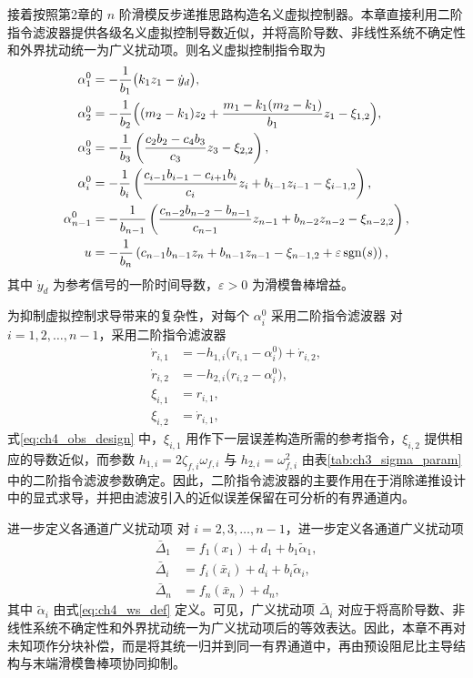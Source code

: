 接着按照第2章的 $n$ 阶滑模反步递推思路构造名义虚拟控制器。本章直接利用二阶指令滤波器提供各级名义虚拟控制导数近似，并将高阶导数、非线性系统不确定性和外界扰动统一为广义扰动项。则名义虚拟控制指令取为
\begin{subequations}
\begin{align}
\alpha_1^0 &= -\frac{1}{b_1}\bigl(k_1z_1-\dot y_d\bigr), \label{eq:ch4_alpha1}\\
\alpha_2^0 &= -\frac{1}{b_2}\Bigl((m_2-k_1)z_2+\frac{m_1-k_1(m_2-k_1)}{b_1}z_1-\xi_{1,2}\Bigr), \label{eq:ch4_alpha2}\\
\alpha_3^0 &= -\frac{1}{b_3}\left(\frac{c_2b_2-c_4b_3}{c_3}z_3-\xi_{2,2}\right), \label{eq:ch4_alpha3}\\
\alpha_i^0 &= -\frac{1}{b_i}\left(\frac{c_{i-1}b_{i-1}-c_{i+1}b_i}{c_i}z_i+b_{i-1}z_{i-1}-\xi_{i-1,2}\right), \label{eq:ch4_alphai}\\
\alpha_{n-1}^0 &= -\frac{1}{b_{n-1}}\left(\frac{c_{n-2}b_{n-2}-b_{n-1}}{c_{n-1}}z_{n-1}+b_{n-2}z_{n-2}-\xi_{n-2,2}\right), \label{eq:ch4_alpha_nm1}\\
u &= -\frac{1}{b_n}\left(c_{n-1}b_{n-1}z_n+b_{n-1}z_{n-1}-\xi_{n-1,2}+\varepsilon\,\mathrm{sgn}(s)\right), \label{eq:ch4_u}
\end{align}
\end{subequations}
其中 $\dot y_d$ 为参考信号的一阶时间导数，$\varepsilon>0$ 为滑模鲁棒增益。

为抑制虚拟控制求导带来的复杂性，对每个 $\alpha_i^0$ 采用二阶指令滤波器
对 $i=1,2,\ldots,n-1$，采用二阶指令滤波器
\begin{subequations}\label{eq:ch4_obs_design}
\begin{align}
\dot r_{i,1} &= -h_{1,i}\bigl(r_{i,1}-\alpha_i^0\bigr)+\dot r_{i,2},\\
\dot r_{i,2} &= -h_{2,i}\bigl(r_{i,2}-\alpha_i^0\bigr),\\
\xi_{i,1} &= r_{i,1},\\
\xi_{i,2} &= \dot r_{i,1},
\end{align}
\end{subequations}
式\eqref{eq:ch4_obs_design} 中，$\xi_{i,1}$ 用作下一层误差构造所需的参考指令，$\xi_{i,2}$ 提供相应的导数近似，而参数 $h_{1,i}=2\zeta_{f,i}\omega_{f,i}$ 与 $h_{2,i}=\omega_{f,i}^2$ 由表\ref{tab:ch3_sigma_param}中的二阶指令滤波参数确定。因此，二阶指令滤波器的主要作用在于消除递推设计中的显式求导，并把由滤波引入的近似误差保留在可分析的有界通道内。

进一步定义各通道广义扰动项
对 $i=2,3,\ldots,n-1$，进一步定义各通道广义扰动项
\begin{subequations}\label{eq:ch4_filter_dist}
\begin{align}
\bar\Delta_1&=f_1(x_1)+d_1+b_1\tilde\alpha_1,\\
\bar\Delta_i&=f_i(\bar x_i)+d_i+b_i\tilde\alpha_i,\\
\bar\Delta_n&=f_n(\bar x_n)+d_n,
\end{align}
\end{subequations}
其中 $\tilde\alpha_i$ 由式\eqref{eq:ch4_ws_def} 定义。可见，广义扰动项 $\bar\Delta_i$ 对应于将高阶导数、非线性系统不确定性和外界扰动统一为广义扰动项后的等效表达。因此，本章不再对未知项作分块补偿，而是将其统一归并到同一有界通道中，再由预设阻尼比主导结构与末端滑模鲁棒项协同抑制。

